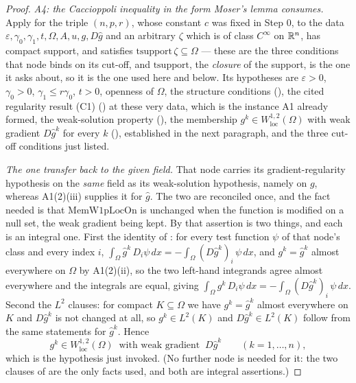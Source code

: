 \begin{proof}
\emph{A4: the Caccioppoli inequality in the form Moser's lemma consumes.}
Apply  for the triple $(n,p,r)$, whose constant
$c$ was fixed in Step 0, to the data
$\varepsilon,\gamma_0,\gamma_1,t,\Omega,A,u,g,D\hat g$ and an arbitrary $\zeta$
which is of class $C^\infty$ on $\mathbb{R}^n$, has compact support, and satisfies
$\mathrm{tsupport}\,\zeta\subseteq\Omega$ --- these are the three conditions
that node binds on its cut-off, and $\mathrm{tsupport}$, the \emph{closure} of
the support, is the one it asks about, so it is the one used here and below.
Its hypotheses are $\varepsilon>0$, $\gamma_0>0$, $\gamma_1\le r\gamma_0$,
$t>0$, openness of $\Omega$, the structure conditions
(), the cited regularity result (C1)
() at these very data, which is the instance A1
already formed, the weak-solution property (), the
membership $g^k\in W^{1,2}_{\mathrm{loc}}(\Omega)$ with weak gradient
$D\hat g^k$ for every $k$ (), established in the next
paragraph, and the three cut-off conditions just listed.

\emph{The one transfer back to the given field.}  That node carries its
gradient-regularity hypothesis on the \emph{same} field as its weak-solution
hypothesis, namely on $g$, whereas A1(2)(iii) supplies it for $\hat g$.  The two
are reconciled once, and the fact needed is that $\mathrm{MemW1pLocOn}$ is
unchanged when the function is modified on a null set, the weak gradient being
kept.  By  that assertion is two things, and each is an
integral one.  First the identity of : for every test
function $\psi$ of that node's class and every index $i$,
$\int_\Omega\hat g^k\,D_i\psi\,dx=-\int_\Omega(D\hat g^k)_i\,\psi\,dx$, and
$g^k=\hat g^k$ almost everywhere on $\Omega$ by A1(2)(ii), so the two left-hand
integrands agree almost everywhere and the integrals are equal, giving
$\int_\Omega g^k\,D_i\psi\,dx=-\int_\Omega(D\hat g^k)_i\,\psi\,dx$.  Second the
$L^2$ clauses: for compact $K\subseteq\Omega$ we have $g^k=\hat g^k$ almost
everywhere on $K$ and $D\hat g^k$ is not changed at all, so $g^k\in L^2(K)$ and
$D\hat g^k\in L^2(K)$ follow from the same statements for $\hat g^k$.  Hence
\[
g^k\in W^{1,2}_{\mathrm{loc}}(\Omega)\ \text{ with weak gradient }\ D\hat g^k
\qquad(k=1,\dots,n),
\tag{A4a}
\]
which is the hypothesis just invoked.  (No further node is needed for it: the
two clauses of  are the only facts used, and both are
integral assertions.)


\end{proof}
